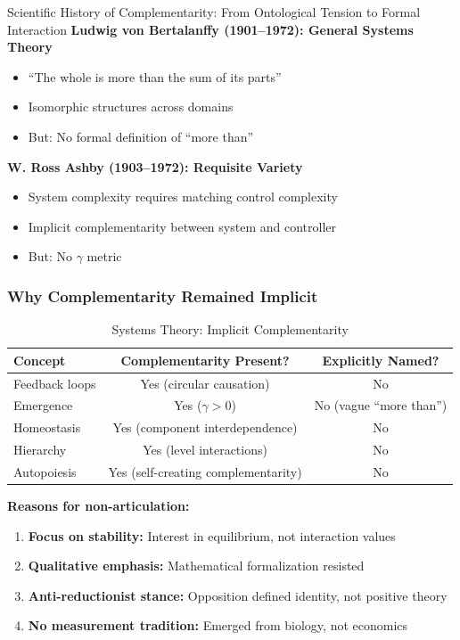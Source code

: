 \begin{chapter}{Scientific History of Complementarity: From Ontological Tension to Formal Interaction}
\textbf{Ludwig von Bertalanffy (1901--1972): General Systems Theory}
\begin{itemize}[noitemsep]
    \item ``The whole is more than the sum of its parts''
    \item Isomorphic structures across domains
    \item But: No formal definition of ``more than''
\end{itemize}

\textbf{W. Ross Ashby (1903--1972): Requisite Variety}
\begin{itemize}[noitemsep]
    \item System complexity requires matching control complexity
    \item Implicit complementarity between system and controller
    \item But: No $\gamma$ metric
\end{itemize}

\subsubsection{Why Complementarity Remained Implicit}

\begin{table}[h]
\centering
\caption{Systems Theory: Implicit Complementarity}
\label{tab:systems-implicit}
\renewcommand{\arraystretch}{1.3}
\begin{tabular}{@{}lcc@{}}
\toprule
\textbf{Concept} & \textbf{Complementarity Present?} & \textbf{Explicitly Named?} \\
\midrule
Feedback loops & Yes (circular causation) & No \\
Emergence & Yes ($\gamma > 0$) & No (vague ``more than'') \\
Homeostasis & Yes (component interdependence) & No \\
Hierarchy & Yes (level interactions) & No \\
Autopoiesis & Yes (self-creating complementarity) & No \\
\bottomrule
\end{tabular}
\end{table}

\textbf{Reasons for non-articulation:}
\begin{enumerate}
    \item \textbf{Focus on stability:} Interest in equilibrium, not interaction values
    \item \textbf{Qualitative emphasis:} Mathematical formalization resisted
    \item \textbf{Anti-reductionist stance:} Opposition defined identity, not positive theory
    \item \textbf{No measurement tradition:} Emerged from biology, not economics
\end{enumerate}


\end{chapter}
